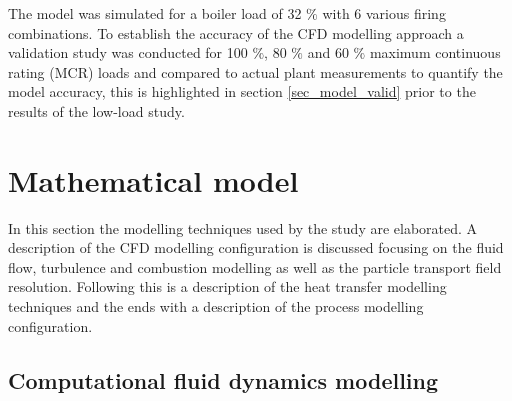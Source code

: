 \documentclass[review]{elsarticle}
\begin{document}
The model was simulated for a boiler load of 32 $\%$  with 6 various firing combinations. To establish the accuracy of the CFD modelling approach a validation study was conducted for 100 $\%$, 80 $\%$ and 60 $\%$ maximum continuous rating (MCR) loads and compared to actual plant measurements to quantify the model accuracy, this is highlighted in section \ref{sec_model_valid} prior to the results of the low-load study. 

\section{Mathematical model}
In this section the modelling techniques used by the study are elaborated. A description of the CFD modelling configuration is discussed focusing on the fluid flow, turbulence and combustion modelling as well as the particle transport field resolution. Following this is a description of the heat transfer modelling techniques and the ends with a description of the process modelling configuration.
\subsection{Computational fluid dynamics modelling}
\end{document}
